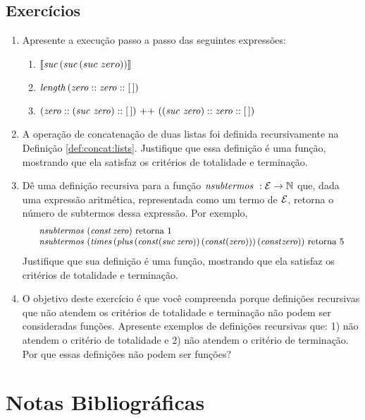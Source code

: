 \subsection{Exerc\'icios}

\begin{enumerate}
  \item Apresente a execu\c{c}\~ao passo a passo das seguintes express\~oes:
  \begin{enumerate}
    \item $\llbracket \textit{suc\/}\, (\textit{suc\/}\, (suc\,\,zero))\rrbracket$
    \item $\textit{length\/}\, (\textit{zero\/} :: \textit{zero\/} :: [\,])$
    \item $(\textit{zero\/} :: (\textit{suc\/}\,\, \textit{zero\/}) ::[\,])\text{ ++ }((\textit{suc\/}\,\,\textit{zero\/}) :: \textit{zero\/} :: [\,])$
  \end{enumerate}
  \item A operação de concatenação de duas listas foi definida recursivamente na Definição \ref{def:concat:lists}. Justifique que essa definição é uma fun\c{c}\~ao, mostrando que ela satisfaz  os critérios de totalidade e termina\c{c}\~ao.
  \item Dê uma defini\c{c}\~ao recursiva para a função $\textit{nsubtermos }: \mathcal{E} \rightarrow \mathbb{N}$ que, dada uma express\~ao aritm\'etica, representada como um termo de $\mathcal{E}$, retorna o número de subtermos dessa expressão. Por exemplo, 
 \[ \small{
\begin{array}{l}
 \textit{nsubtermos } (\textit{const\/}\, \textit{zero\/}) \text{ retorna 1} \\
 \textit{nsubtermos } (\textit{times\/}\,(\textit{plus\/}\,(\textit{const\/}(\textit{suc\/}\,\textit{zero\/}))\, (\textit{const\/}(\textit{zero\/})))\, (\textit{const\/}\textit{zero\/})) \text{ retorna 5} 
 \end{array} }
 \]
Justifique que sua definição é uma função, mostrando que ela satisfaz os critérios de totalidade e termina\c{c}\~ao.
  \item O objetivo deste exerc\'icio \'e que você compreenda porque defini\c{c}\~oes recursivas que n\~ao atendem os crit\'erios de totalidade e termina\c{c}\~ao n\~ao podem ser consideradas fun\c{c}\~oes.
        Apresente exemplos de defini\c{c}\~oes recursivas que: 1) n\~ao atendem o crit\'erio de totalidade e 2) n\~ao atendem o crit\'erio de termina\c{c}\~ao. Por que essas definições n\~ao podem ser fun\c{c}\~oes?
\end{enumerate}


\section{Notas Bibliogr\'aficas}

